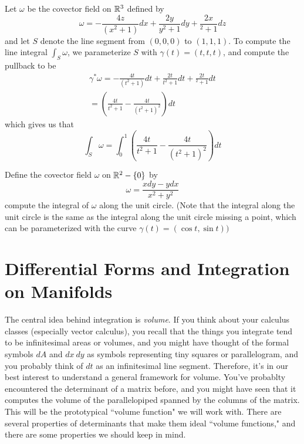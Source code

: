 \begin{exmp}
Let $\omega$ be the covector field on $\mathbb{R}^3$ defined by
$$\omega = -\frac{4z}{(x^2 + 1)} dx + \frac{2y}{y^2 + 1}dy + \frac{2x}{^2 + 1} dz $$
and let $S$ denote the line segment from $(0,0,0)$ to $(1,1,1)$. To compute
the line integral $\int_S \omega$, we parameterize $S$ with $\gamma(t) = (t,t,t)$,
and compute the pullback to be
\begin{align*}
\gamma^*\omega = -\frac{4t}{(t^2 + 1)} dt + \frac{2t}{t^2 + 1}dt + \frac{2t}{^2 + 1} dt \\
= \left( \frac{4t}{t^2 + 1} - \frac{4t}{(t^2 + 1)^2} \right) dt
\end{align*}
which gives us that
$$\int_S \omega = \int_0^1 \left( \frac{4t}{t^2 + 1} - \frac{4t}{(t^2 + 1)^2} \right) dt$$
\end{exmp}
%
\begin{exer}
Define the covector field $\omega$ on $\mathbb{R}^2 - \left\lbrace 0 \right\rbrace$ by
$$\omega = \frac{x dy - ydx}{x^2 + y^2} $$
compute the integral of $\omega$ along the unit circle. (Note that the integral
along the unit circle is the same as the integral along the unit circle
missing a point, which can be parameterized with the curve
$\gamma(t) = (\cos t, \sin t))$
\end{exer}
%
\section{Differential Forms and Integration on Manifolds}
%
The central idea behind integration is \emph{volume}. If you think about your
calculus classes (especially vector calculus), you recall that the things
you integrate tend to be infinitesimal areas or volumes, and you might have
thought of the formal symbols $dA$ and $dx~dy$ as symbols representing
tiny squares or parallelogram, and you probably think of $dt$ as an
infinitesimal line segment. Therefore, it's in our best interest to
understand a general framework for volume. You've probablty encountered
the determinant of a matrix before, and you might have seen that it computes
the volume of the parallelopiped spanned by the columns of the matrix. This
will be the prototypical ``volume function" we will work with. There are
several properties of determinants that make them ideal ``volume functions,"
and there are some properties we should keep in mind.  \\

